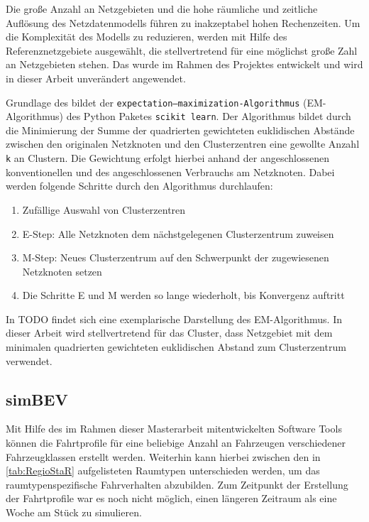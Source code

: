 Die große Anzahl an Netzgebieten und die hohe räumliche und zeitliche Auflösung des Netzdatenmodells führen zu inakzeptabel hohen Rechenzeiten.
Um die Komplexität des Modells zu reduzieren, werden mit Hilfe des \kmeans Referenznetzgebiete ausgewählt, die stellvertretend für eine möglichst große Zahl an Netzgebieten stehen.
Das \kmeans wurde im Rahmen des \openego Projektes entwickelt und wird in dieser Arbeit unverändert angewendet. \cite{Mueller2019}\medskip

Grundlage des \kmeans bildet der \texttt{expectation–maximization-Algorithmus} (EM-Algorithmus) des Python Paketes \texttt{scikit learn}. \cite{scikit-learn2011}
Der Algorithmus bildet durch die Minimierung der Summe der quadrierten gewichteten euklidischen Abstände zwischen den originalen Netzknoten und den Clusterzentren eine gewollte Anzahl \texttt{k} an Clustern.
Die Gewichtung erfolgt hierbei anhand der angeschlossenen konventionellen und des angeschlossenen Verbrauchs am Netzknoten.
Dabei werden folgende Schritte durch den Algorithmus durchlaufen:

\begin{enumerate}
	\item Zufällige Auswahl von Clusterzentren
	\item E-Step: Alle Netzknoten dem nächstgelegenen Clusterzentrum zuweisen
	\item M-Step: Neues Clusterzentrum auf den Schwerpunkt der zugewiesenen Netzknoten setzen
	\item Die Schritte E und M werden so lange wiederholt, bis Konvergenz auftritt
\end{enumerate}


In {\color{red} TODO} findet sich eine exemplarische Darstellung des EM-Algorithmus.
In dieser Arbeit wird stellvertretend für das Cluster, dass Netzgebiet mit dem minimalen quadrierten gewichteten euklidischen Abstand zum Clusterzentrum verwendet.


\subsection{simBEV}\label{chap:simbev_theo}


Mit Hilfe des im Rahmen dieser Masterarbeit mitentwickelten Software Tools \simbev können die Fahrtprofile für eine beliebige Anzahl an Fahrzeugen verschiedener Fahrzeugklassen erstellt werden.
Weiterhin kann hierbei zwischen den in \autoref{tab:RegioStaR} aufgelisteten \Regiostar Raumtypen unterschieden werden, um das raumtypenspezifische Fahrverhalten abzubilden.
Zum Zeitpunkt der Erstellung der Fahrtprofile war es noch nicht möglich, einen längeren Zeitraum als eine Woche am Stück zu simulieren.


